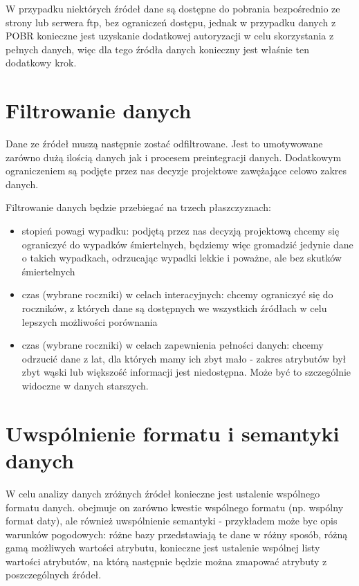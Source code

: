 W przypadku niektórych źródeł dane są dostępne do pobrania bezpośrednio
ze strony lub serwera ftp, bez ograniczeń dostępu, jednak w przypadku
danych z POBR konieczne jest uzyskanie dodatkowej autoryzacji w celu
skorzystania z pełnych danych, więc dla tego źródła danych konieczny
jest właśnie ten dodatkowy krok.

\section{Filtrowanie danych}\label{filtrowanie-danych}

Dane ze źródeł muszą następnie zostać odfiltrowane. Jest to umotywowane
zarówno dużą ilością danych jak i procesem preintegracji danych.
Dodatkowym ograniczeniem są podjęte przez nas decyzje projektowe
zawężające celowo zakres danych.

Filtrowanie danych będzie przebiegać na trzech płaszczyznach:

\begin{itemize}
\itemsep1pt\parskip0pt
\item
  stopień powagi wypadku: podjętą przez nas decyzją projektową chcemy
  się ograniczyć do wypadków śmiertelnych, będziemy więc gromadzić
  jedynie dane o takich wypadkach, odrzucając wypadki lekkie i poważne,
  ale bez skutków śmiertelnych\\
\item
  czas (wybrane roczniki) w celach interacyjnych: chcemy ograniczyć się
  do roczników, z których dane są dostępnych we wszystkich źródłach w
  celu lepszych możliwości porównania\\
\item
  czas (wybrane roczniki) w celach zapewnienia pełności danych: chcemy
  odrzucić dane z lat, dla których mamy ich zbyt mało - zakres atrybutów
  był zbyt wąski lub większość informacji jest niedostępna. Może być to
  szczególnie widoczne w danych starszych.
\end{itemize}

\section{Uwspólnienie formatu i semantyki danych}\label{uwspolnienie-formatu-i-semantyki-danych}

W celu analizy danych zróżnych źródeł konieczne jest ustalenie wspólnego
formatu danych. obejmuje on zarówno kwestie wspólnego formatu (np.
wspólny format daty), ale również uwspólnienie semantyki - przykładem
może byc opis warunków pogodowych: różne bazy przedstawiają te dane w
różny sposób, różną gamą możliwych wartości atrybutu, konieczne jest
ustalenie wspólnej listy wartości atrybutów, na którą następnie będzie
można zmapować atrybuty z poszczególnych źródeł.

